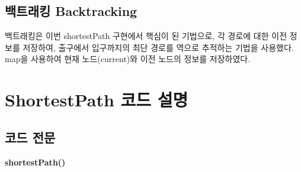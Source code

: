 \documentclass{article}
\begin{document}
\subsection{백트래킹 Backtracking}
백트래킹은 이번 shortestPath 구현에서 핵심이 된 기법으로, 각 경로에 대한 이전 정보를 저장하여, 출구에서 입구까지의 최단 경로를 역으로 추적하는 기법을 사용했다. map을 사용하여 현재 노드(current)와 이전 노드의 정보를 저장하였다.

\section{ShortestPath 코드 설명}
\subsection{코드 전문}
\lstset{language=C++}
\textbf{shortestPath()}
\end{document}
